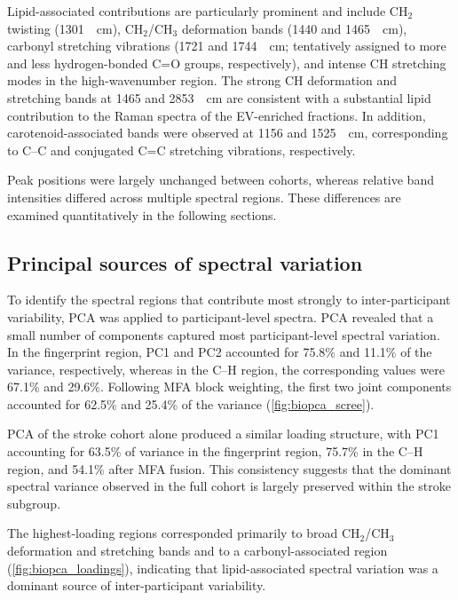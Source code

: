 \documentclass[preprint,12pt]{elsarticle}
\begin{document}
Lipid-associated contributions are particularly prominent and include CH$_2$ twisting (1301~\si{\per\centi\metre}), CH$_2$/CH$_3$ deformation bands (1440 and 1465~\si{\per\centi\metre}), carbonyl stretching vibrations (1721 and 1744~\si{\per\centi\metre}; tentatively assigned to more and less hydrogen-bonded C=O groups, respectively), and intense CH stretching modes in the high-wavenumber region. The strong CH deformation and stretching bands at 1465 and 2853~\si{\per\centi\metre} are consistent with a substantial lipid contribution to the Raman spectra of the EV-enriched fractions. In addition, carotenoid-associated bands were observed at 1156 and 1525~\si{\per\centi\metre}, corresponding to C--C and conjugated C=C stretching vibrations, respectively.

Peak positions were largely unchanged between cohorts, whereas relative band intensities differed across multiple spectral regions. These differences are examined quantitatively in the following sections.


\subsection{Principal sources of spectral variation}
\label{subsec:biopca_results}

To identify the spectral regions that contribute most strongly to inter-participant variability, PCA was applied to participant-level spectra. PCA revealed that a small number of components captured most participant-level spectral variation. In the fingerprint region, PC1 and PC2 accounted for 75.8\% and 11.1\% of the variance, respectively, whereas in the C--H region, the corresponding values were 67.1\% and 29.6\%. Following MFA block weighting, the first two joint components accounted for 62.5\% and 25.4\% of the variance (\cref{fig:biopca_scree}).

PCA of the stroke cohort alone produced a similar loading structure, with PC1 accounting for 63.5\% of variance in the fingerprint region, 75.7\% in the C--H region, and 54.1\% after MFA fusion. This consistency suggests that the dominant spectral variance observed in the full cohort is largely preserved within the stroke subgroup.

The highest-loading regions corresponded primarily to broad CH$_2$/CH$_3$ deformation and stretching bands and to a carbonyl-associated region (\cref{fig:biopca_loadings}), indicating that lipid-associated spectral variation was a dominant source of inter-participant variability.
\end{document}
